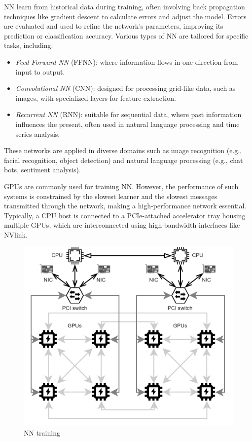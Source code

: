 NN learn from historical data during training, often involving back propagation techniques like gradient descent to calculate errors and adjust the model. 
Errors are evaluated and used to refine the network's parameters, improving its prediction or classification accuracy.
Various types of NN are tailored for specific tasks, including:
\begin{itemize}
    \item \textit{Feed Forward NN} (FFNN): where information flows in one direction from input to output.
    \item \textit{Convolutional NN} (CNN): designed for processing grid-like data, such as images, with specialized layers for feature extraction.
    \item \textit{Recurrent NN} (RNN): suitable for sequential data, where past information influences the present, often used in natural language processing and time series analysis.
\end{itemize}
These networks are applied in diverse domains such as image recognition (e.g., facial recognition, object detection) and natural language processing (e.g., chat bots, sentiment analysis).

GPUs are commonly used for training NN. 
However, the performance of such systems is constrained by the slowest learner and the slowest messages transmitted through the network, making a high-performance network essential. 
Typically, a CPU host is connected to a PCIe-attached accelerator tray housing multiple GPUs, which are interconnected using high-bandwidth interfaces like NVlink.
\begin{figure}[H]
    \centering
    \includegraphics[width=0.75\linewidth]{images/nnt.png}
    \caption{NN training}
\end{figure}

